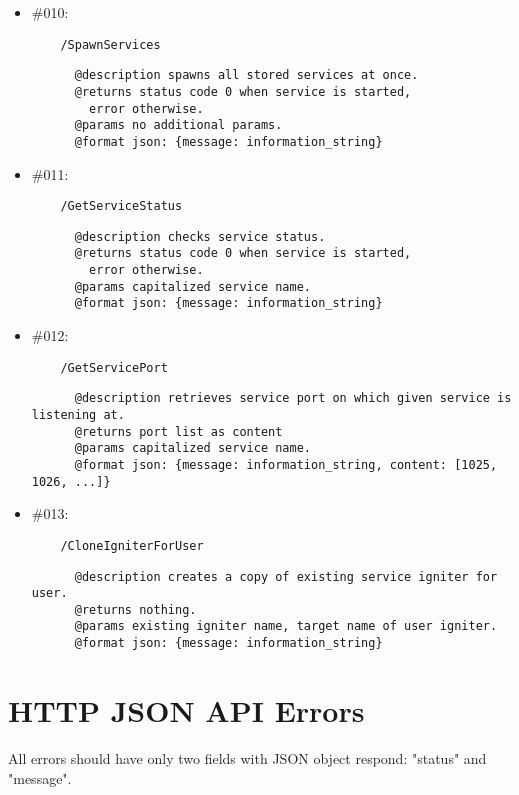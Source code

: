 \documentclass[11pt,a4paper]{scrartcl}
\begin{document}
\begin{itemize}
    \item \#010:
      \begin{verbatim}
    /SpawnServices
      \end{verbatim}
      \begin{verbatim}
      @description spawns all stored services at once.
      @returns status code 0 when service is started,
        error otherwise.
      @params no additional params.
      @format json: {message: information_string}
      \end{verbatim}

    \item \#011:
      \begin{verbatim}
    /GetServiceStatus
      \end{verbatim}
      \begin{verbatim}
      @description checks service status.
      @returns status code 0 when service is started,
        error otherwise.
      @params capitalized service name.
      @format json: {message: information_string}
      \end{verbatim}

    \item \#012:
      \begin{verbatim}
    /GetServicePort
      \end{verbatim}
      \begin{verbatim}
      @description retrieves service port on which given service is listening at.
      @returns port list as content
      @params capitalized service name.
      @format json: {message: information_string, content: [1025, 1026, ...]}
      \end{verbatim}

    \item \#013:
      \begin{verbatim}
    /CloneIgniterForUser
      \end{verbatim}
      \begin{verbatim}
      @description creates a copy of existing service igniter for user.
      @returns nothing.
      @params existing igniter name, target name of user igniter.
      @format json: {message: information_string}
      \end{verbatim}



  \end{itemize}


\section{HTTP JSON API Errors}\label{sec:apierrors}
  All errors should have only two fields with JSON object respond: "status" and "message".
\end{document}
